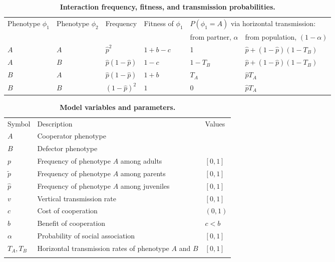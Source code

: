 \documentclass[12pt]{extarticle}
\begin{document}
{ 
\bigskip
\begin{table}[h]
\caption{\textbf{Interaction frequency, fitness, and transmission probabilities.}}
\begin{tabular}{@{}llllll@{}}
\toprule
\multirow{2}{*}{Phenotype $\phi_1$} &
  \multirow{2}{*}{Phenotype $\phi_2$} &
  \multirow{2}{*}{Frequency} &
  \multirow{2}{*}{Fitness of $\phi_1$} &
  \multicolumn{2}{l}{$P(\phi_1=A)$ via horizontal transmission:} \\ \cmidrule(l){5-6} 
    &     &                      &         & from partner, $\alpha$ & from population, $(1-\alpha)$ \\ \cmidrule(r){1-6}
$A$ & $A$ & $\hat{p}^2$          & $1+b-c$ & 1                      & $\hat{p}+(1-\hat{p})(1-T_B)$  \\
$A$ & $B$ & $\hat{p}(1-\hat{p})$ & $1-c$   & $1-T_B$                & $\hat{p}+(1-\hat{p})(1-T_B)$  \\
$B$ & $A$ & $\hat{p}(1-\hat{p})$ & $1+b$   & $T_A$                  & $\hat{p} T_A$                 \\
$B$ & $B$ & $(1-\hat{p})^2$      & $1$     & $0$                    & $\hat{p} T_A$                 \\ \bottomrule
\end{tabular}
\label{table:interactions}
\end{table}
\bigskip


\bigskip
\begin{table}[h]
\centering
\caption{\textbf{Model variables and parameters.}
}
\begin{tabular}{lll}
\toprule
Symbol & Description & Values \\ \cmidrule(r){1-3}
$A$ & Cooperator phenotype & \\
$B$ & Defector phenotype & \\
$p$ & Frequency of phenotype $A$ among adults & $[0,1]$ \\
$\tilde p$ & Frequency of phenotype $A$ among parents & $[0,1]$ \\
$\hat p$ & Frequency of phenotype $A$ among juveniles & $[0,1]$ \\
$v$ & Vertical transmission rate & $[0,1]$ \\
$c$ & Cost of cooperation & $(0,1)$ \\
$b$ & Benefit of cooperation & $c<b$ \\
$\alpha$ & Probability of social association & $[0,1]$ \\
$T_A, T_B$ & Horizontal transmission rates of phenotype $A$ and $B$ & $[0,1]$ \\
\\ \bottomrule
\end{tabular}
\label{table:vars_params}
\end{table}

}
\end{document}
